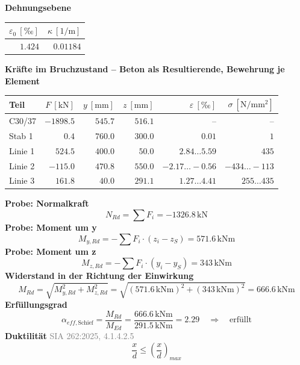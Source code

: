 \documentclass[11pt,a4paper]{article}
\newcommand{\normref}[1]{{\small\textcolor{gray}{#1}}}
\begin{document}
\noindent\textbf{Dehnungsebene}
\begin{longtable}{rr}
\hline
$\varepsilon_0\ [\text{‰}]$ & $\kappa\ [\mathrm{1/m}]$ \\
\hline
\endhead
$1.424$ & $0.01184$ \\
\hline
\end{longtable}
\noindent\textbf{Kräfte im Bruchzustand -- Beton als Resultierende, Bewehrung je Element}
\begin{longtable}{lrrrrr}
\hline
Teil & $F\ [\mathrm{kN}]$ & $y\ [\mathrm{mm}]$ & $z\ [\mathrm{mm}]$ & $\varepsilon\ [\text{‰}]$ & $\sigma\ [\mathrm{N/mm^2}]$ \\
\hline
\endhead
C30/37 & $-1898.5$ & $545.7$ & $516.1$ & – & – \\
Stab 1 & $0.4$ & $760.0$ & $300.0$ & $0.01$ & $1$ \\
Linie 1 & $524.5$ & $400.0$ & $50.0$ & $2.84 \ldots 5.59$ & $435$ \\
Linie 2 & $-115.0$ & $470.8$ & $550.0$ & $-2.17 \ldots -0.56$ & $-434 \ldots -113$ \\
Linie 3 & $161.8$ & $40.0$ & $291.1$ & $1.27 \ldots 4.41$ & $255 \ldots 435$ \\
\hline
\end{longtable}
\noindent\textbf{Probe: Normalkraft}
\begin{equation*}
N_{Rd} = \sum F_i = -1326.8\,\mathrm{kN}
\end{equation*}
\noindent\textbf{Probe: Moment um y}
\begin{equation*}
M_{y,Rd} = -\sum F_i \cdot (z_i - z_S) = 571.6\,\mathrm{kNm}
\end{equation*}
\noindent\textbf{Probe: Moment um z}
\begin{equation*}
M_{z,Rd} = -\sum F_i \cdot (y_i - y_S) = 343\,\mathrm{kNm}
\end{equation*}
\noindent\textbf{Widerstand in der Richtung der Einwirkung}
\begin{equation*}
M_{Rd} = \sqrt{M_{y,Rd}^{2} + M_{z,Rd}^{2}} = \sqrt{\left(571.6\,\mathrm{kNm}\right)^{2} + \left(343\,\mathrm{kNm}\right)^{2}} = 666.6\,\mathrm{kNm}
\end{equation*}
\noindent\textbf{Erfüllungsgrad}
\begin{equation*}
\alpha_{eff,\text{Schief}} = \frac{M_{Rd}}{M_{Ed}} = \frac{666.6\,\mathrm{kNm}}{291.5\,\mathrm{kNm}} = 2.29 \quad \Rightarrow \quad \text{erfüllt}
\end{equation*}
\noindent\textbf{Duktilität} \hfill \normref{SIA 262:2025, 4.1.4.2.5}
\begin{equation*}
\frac{x}{d} \le \left(\frac{x}{d}\right)_{max}
\end{equation*}
\end{document}

